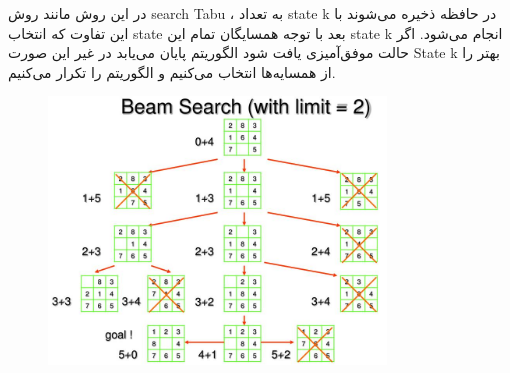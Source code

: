 در این روش مانند روش search Tabu ، به تعداد state k در حافظه ذخیره می‌شوند با این تفاوت که انتخاب state بعد با توجه همسایگان تمام این state k انجام می‌شود.
اگر حالت موفق‌آمیزی یافت شود الگوریتم پایان می‌یابد در غیر این صورت State k بهتر را از همسایه‌ها انتخاب می‌کنیم و الگوریتم را تکرار می‌کنیم.

\begin{figure}[H]
    \centering
    \includegraphics[width=0.8\textwidth]{source/local-beam-example.png}
    \label{fig:beam-search-example}
\end{figure}

